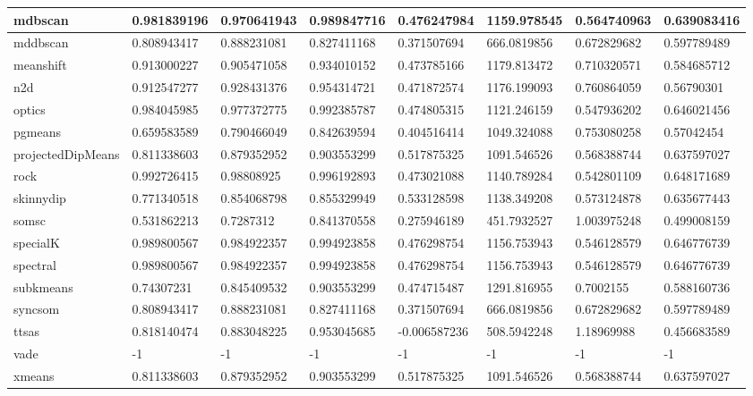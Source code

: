 \begin{table}[H]
\begin{tabular}{|l|l|l|l|l|l|l|l|}
\hline
mdbscan & 0.981839196 & 0.970641943 & 0.989847716 & 0.476247984 & 1159.978545 & 0.564740963 & 0.639083416 \\
\hline
mddbscan & 0.808943417 & 0.888231081 & 0.827411168 & 0.371507694 & 666.0819856 & 0.672829682 & 0.597789489 \\
\hline
meanshift & 0.913000227 & 0.905471058 & 0.934010152 & 0.473785166 & 1179.813472 & 0.710320571 & 0.584685712 \\
\hline
n2d & 0.912547277 & 0.928431376 & 0.954314721 & 0.471872574 & 1176.199093 & 0.760864059 & 0.56790301 \\
\hline
optics & 0.984045985 & 0.977372775 & 0.992385787 & 0.474805315 & 1121.246159 & 0.547936202 & 0.646021456 \\
\hline
pgmeans & 0.659583589 & 0.790466049 & 0.842639594 & 0.404516414 & 1049.324088 & 0.753080258 & 0.57042454 \\
\hline
projectedDipMeans & 0.811338603 & 0.879352952 & 0.903553299 & 0.517875325 & 1091.546526 & 0.568388744 & 0.637597027 \\
\hline
rock & 0.992726415 & 0.98808925 & 0.996192893 & 0.473021088 & 1140.789284 & 0.542801109 & 0.648171689 \\
\hline
skinnydip & 0.771340518 & 0.854068798 & 0.855329949 & 0.533128598 & 1138.349208 & 0.573124878 & 0.635677443 \\
\hline
somsc & 0.531862213 & 0.7287312 & 0.841370558 & 0.275946189 & 451.7932527 & 1.003975248 & 0.499008159 \\
\hline
specialK & 0.989800567 & 0.984922357 & 0.994923858 & 0.476298754 & 1156.753943 & 0.546128579 & 0.646776739 \\
\hline
spectral & 0.989800567 & 0.984922357 & 0.994923858 & 0.476298754 & 1156.753943 & 0.546128579 & 0.646776739 \\
\hline
subkmeans & 0.74307231 & 0.845409532 & 0.903553299 & 0.474715487 & 1291.816955 & 0.7002155 & 0.588160736 \\
\hline
syncsom & 0.808943417 & 0.888231081 & 0.827411168 & 0.371507694 & 666.0819856 & 0.672829682 & 0.597789489 \\
\hline
ttsas & 0.818140474 & 0.883048225 & 0.953045685 & -0.006587236 & 508.5942248 & 1.18969988 & 0.456683589 \\
\hline
vade & -1 & -1 & -1 & -1 & -1 & -1 & -1 \\
\hline
xmeans & 0.811338603 & 0.879352952 & 0.903553299 & 0.517875325 & 1091.546526 & 0.568388744 & 0.637597027 \\
\hline
\end{tabular}
\end{table}

